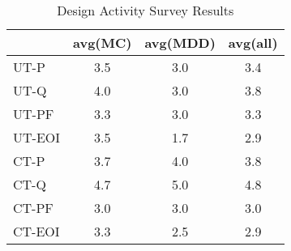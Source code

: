 \documentclass[final_report_innit.tex]{subfiles}
\begin{document}
\begin{table}[h]
\caption{Design Activity Survey Results}
\centering
\begin{tabular}{@{}l|c|c|c|@{}}
\cmidrule(l){2-4}
                             & \multicolumn{1}{l|}{avg(MC)} & \multicolumn{1}{l|}{avg(MDD)} & \multicolumn{1}{l|}{avg(all)} \\ \midrule
\multicolumn{1}{|l|}{UT-P}   & 3.5                          & 3.0                           & 3.4                           \\ \midrule
\multicolumn{1}{|l|}{UT-Q}   & 4.0                          & 3.0                           & 3.8                           \\ \midrule
\multicolumn{1}{|l|}{UT-PF}  & 3.3                          & 3.0                           & 3.3                           \\ \midrule
\multicolumn{1}{|l|}{UT-EOI} & 3.5                          & 1.7                           & 2.9                           \\ \midrule
\multicolumn{1}{|l|}{CT-P}   & 3.7                          & 4.0                           & 3.8                           \\ \midrule
\multicolumn{1}{|l|}{CT-Q}   & 4.7                          & 5.0                           & 4.8                           \\ \midrule
\multicolumn{1}{|l|}{CT-PF}  & 3.0                          & 3.0                           & 3.0                           \\ \midrule
\multicolumn{1}{|l|}{CT-EOI} & 3.3                          & 2.5                           & 2.9                           \\ \bottomrule
\end{tabular}
\end{table}
\end{document}
